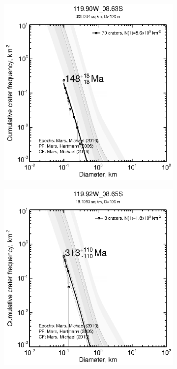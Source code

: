 \documentclass[12pt,letter]{article}
\begin{document}
\begin{figure}[h]
\begin{subfigure}{.33\textwidth}
\end{subfigure}
\begin{subfigure}{.33\textwidth}
  \includegraphics[width=\linewidth,clip,trim=1cm 1cm 1.5cm 1cm]{figures/craterstats/119-90W_08-63S_100m_cum.eps}
\end{subfigure}%
\begin{subfigure}{.33\textwidth}
  \includegraphics[width=\linewidth,clip,trim=1cm 1cm 1.5cm 1cm]{figures/craterstats/119-92W_08-65S_100m_cum.eps}

\end{subfigure}
\end{figure}
\end{document}
